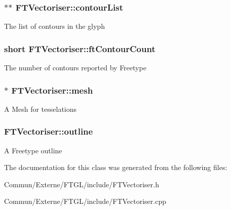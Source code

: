 \subsubsection[{\texorpdfstring{contour\+List}{contourList}}]{$\ast$$\ast$ F\+T\+Vectoriser\+::contour\+List\hspace{0.3cm}{\ttfamily [private]}}\hypertarget{class_f_t_vectoriser_a0e05f275b39c0e61e6d46c1f2b428c9d}{}\label{class_f_t_vectoriser_a0e05f275b39c0e61e6d46c1f2b428c9d}
The list of contours in the glyph 
\subsubsection[{\texorpdfstring{ft\+Contour\+Count}{ftContourCount}}]{\setlength{\rightskip}{0pt plus 5cm}short F\+T\+Vectoriser\+::ft\+Contour\+Count\hspace{0.3cm}{\ttfamily [private]}}\hypertarget{class_f_t_vectoriser_a0d425461d13488ec2a0570da82f15d17}{}\label{class_f_t_vectoriser_a0d425461d13488ec2a0570da82f15d17}
The number of contours reported by Freetype 
\subsubsection[{\texorpdfstring{mesh}{mesh}}]{$\ast$ F\+T\+Vectoriser\+::mesh\hspace{0.3cm}{\ttfamily [private]}}\hypertarget{class_f_t_vectoriser_afefc2b2c3830e00a2b2c51db995233f0}{}\label{class_f_t_vectoriser_afefc2b2c3830e00a2b2c51db995233f0}
A Mesh for tesselations 
\subsubsection[{\texorpdfstring{outline}{outline}}]{ F\+T\+Vectoriser\+::outline\hspace{0.3cm}{\ttfamily [private]}}\hypertarget{class_f_t_vectoriser_a37032433aac24d7d05927847bacecdee}{}\label{class_f_t_vectoriser_a37032433aac24d7d05927847bacecdee}
A Freetype outline 

The documentation for this class was generated from the following files\+:\begin{DoxyCompactItemize}
\item 
Commun/\+Externe/\+F\+T\+G\+L/include/F\+T\+Vectoriser.\+h\item 
Commun/\+Externe/\+F\+T\+G\+L/include/F\+T\+Vectoriser.\+cpp\end{DoxyCompactItemize}
